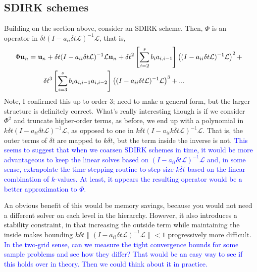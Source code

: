 \documentclass[a4paper,12pt]{article}
\newcommand{\tcb}{\textcolor{blue}}
\begin{document}
\subsection{SDIRK schemes} 

Building on the section above, consider an SDIRK scheme. Then, $\Phi$ is an operator in $\delta t(I - a_{ii}\delta t\mathcal{L})^{-1}\mathcal{L}$,
that is,
%
\begin{align*}
\Phi\mathbf{u}_{n} & = \mathbf{u}_n + \delta t(I - a_{ii}\delta t\mathcal{L})^{-1}\mathcal{L}\mathbf{u}_n +
	\delta t^2 \left[\sum_{i=2}^s b_ia_{i,i-1}\right] \left((I - a_{ii}\delta t\mathcal{L})^{-1}\mathcal{L}\right)^2 +\\ & \hspace{5ex} 
	\delta t^3 \left[\sum_{i=3}^s b_ia_{i,i-1}a_{i,i-2}\right] \left((I - a_{ii}\delta t\mathcal{L})^{-1}\mathcal{L}\right)^3 + ...
\end{align*}
%
Note, I confirmed this up to order-3; need to make a general form, but the larger structure is definitely correct. What's really interesting
though is if we consider $\Phi^2$ and truncate higher-order terms, as before, we end up with a polynomial in 
$k\delta t(I - a_{ii}\delta t\mathcal{L})^{-1}\mathcal{L}$, as opposed to one in $k\delta t(I - a_{ii}k\delta t\mathcal{L})^{-1}\mathcal{L}$. That is,
the outer terms of $\delta t$ are mapped to $k\delta t$, but the term inside the inverse is not. \tcb{This seems to suggest that when we
coarsen SDIRK schemes in time, it would be more advantageous to keep the linear solves based on
$(I - a_{ii}\delta t\mathcal{L})^{-1}\mathcal{L}$ and, in some sense, extrapolate the time-stepping routine to step-size $k\delta t$
based on the linear combination of $k$-values. At least, it appears the resulting operator would be a better approximation to $\Phi$.}

An obvious benefit of this would be memory savings, because you would not need a different solver on each level in the
hierarchy. However, it also introduces a stability constraint, in that increasing the outside term while maintaining the inside
makes bounding $k\delta t\|(I - a_{ii}\delta t\mathcal{L})^{-1}\mathcal{L}\| < 1$ progressively more difficult. \tcb{In the two-grid sense,
can we measure the tight convergence bounds for some sample problems and see how they differ? That would be an easy way
to see if this holds over in theory. Then we could think about it in practice.}
\end{document}
